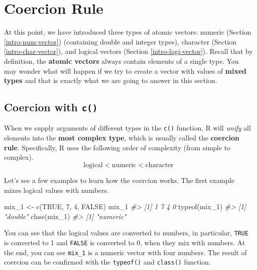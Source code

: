 \documentclass[
]{book}
\newenvironment{Shaded}{\begin{snugshade}}{\end{snugshade}}
\newcommand{\CommentTok}[1]{\textcolor[rgb]{0.56,0.35,0.01}{\textit{#1}}}
\newcommand{\ConstantTok}[1]{\textcolor[rgb]{0.00,0.00,0.00}{#1}}
\newcommand{\DecValTok}[1]{\textcolor[rgb]{0.00,0.00,0.81}{#1}}
\newcommand{\FunctionTok}[1]{\textcolor[rgb]{0.00,0.00,0.00}{#1}}
\newcommand{\NormalTok}[1]{#1}
\newcommand{\OtherTok}[1]{\textcolor[rgb]{0.56,0.35,0.01}{#1}}
\begin{document}
\hypertarget{coercion-rule}{%
\section{Coercion Rule}\label{coercion-rule}}

At this point, we have introduced three types of atomic vectors: numeric (Section \ref{intro-num-vector}) (containing double and integer types), character (Section \ref{intro-char-vector}), and logical vectors (Section \ref{intro-logi-vector}). Recall that by definition, the \textbf{atomic vectors} always contain elements of a single type. You may wonder what will happen if we try to create a vector with values of \textbf{mixed types} and that is exactly what we are going to answer in this section.

\hypertarget{coercion-with-c}{%
\subsection{\texorpdfstring{Coercion with \texttt{c()}}{Coercion with c()}}\label{coercion-with-c}}

When we supply arguments of different types in the \texttt{c()} function, R will \emph{unify} all elements into the \textbf{most complex type}, which is usually called the \textbf{coercion rule}. Specifically, R uses the following order of complexity (from simple to complex).
\[\mbox{logical} < \mbox{numeric} < \mbox{character}\]

Let's see a few examples to learn how the coercion works. The first example mixes logical values with numbers.

\begin{Shaded}
\begin{Highlighting}[]
\NormalTok{mix\_1 }\OtherTok{\textless{}{-}} \FunctionTok{c}\NormalTok{(}\ConstantTok{TRUE}\NormalTok{, }\DecValTok{7}\NormalTok{, }\DecValTok{4}\NormalTok{, }\ConstantTok{FALSE}\NormalTok{)}
\NormalTok{mix\_1 }
\CommentTok{\#\textgreater{} [1] 1 7 4 0}
\FunctionTok{typeof}\NormalTok{(mix\_1)}
\CommentTok{\#\textgreater{} [1] "double"}
\FunctionTok{class}\NormalTok{(mix\_1)}
\CommentTok{\#\textgreater{} [1] "numeric"}
\end{Highlighting}
\end{Shaded}

You can see that the logical values are converted to numbers, in particular, \texttt{TRUE} is converted to 1 and \texttt{FALSE} is converted to 0, when they mix with numbers. At the end, you can see \texttt{mix\_1} is a numeric vector with four numbers. The result of coercion can be confirmed with the \texttt{typeof()} and \texttt{class()} function.
\end{document}
